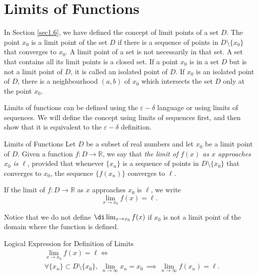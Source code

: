 \section{Limits of Functions }\label{sec2.1 }

 In Section \ref{sec1.6}, we have defined the concept of limit points of a set $D$. The point $x_0$ is a limit point of the set $D$ if there is a sequence of points in $D\setminus\{x_0\}$ that converges to $x_0$. A limit point of a set is not necessarily in that set. A set that contains all its limit points is a closed set. If a point $x_0$ is in a set $D$ but is not a limit point of $D$, it is called an isolated point of $D$. If $x_0$ is an isolated point of $D$, there is a neighbourhood $(a,b)$ of $x_0$ which intersects the set $D$ only at the point $x_0$.
 
 Limits of functions can be defined using the $\varepsilon-\delta$ language or using limits of sequences. We will define the concept using limits of sequences first, and then show that it is equivalent to the $\varepsilon-\delta$  definition.
 
 \begin{definition} 
 {Limits of   Functions}
 Let $D$ be a subset of real numbers and let $x_0$ be a limit point of $D$. Given a function $f:D\rightarrow \mathbb{R}$, we say that {\it the limit of $f(x)$ as $x$ approaches $x_0$ is $\ell$}, provided that whenever $\{x_n\}$ is a sequence of points in $D\setminus\{x_0\}$ that converges to $x_0$, the sequence $\{f(x_n)\}$ converges to $\ell$. 
 
If the limit of $f:D\rightarrow \mathbb{R}$ as $x$ approaches $x_0$ is $\ell$, we write
 \[\lim_{x\rightarrow x_0}f(x)=\ell.\]
 \end{definition}
 Notice that we do not define $\di\lim_{x\rightarrow x_0}f(x)$ if $x_0$ is not a limit point of the domain where the function is defined. 
  
 \begin{highlight}{Logical Expression for Definition of  Limits}
 ~\vspace{-0.5cm}
 \begin{align*}
 & \lim_{x\rightarrow x_0}f(x)=\ell
 \iff \\& \forall  \{x_n\} \subset   D\setminus\{x_0\},\;\lim_{n\rightarrow \infty}x_n=x_0 \,\implies\,\lim_{n\rightarrow\infty}f(x_n)=\ell.\end{align*}
 \end{highlight}
 
